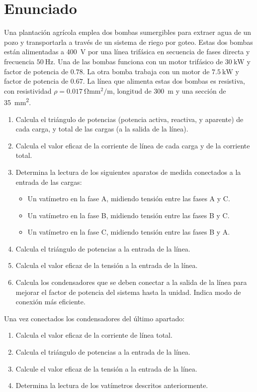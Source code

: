  \section{Enunciado}

 Una plantación agrícola emplea dos bombas sumergibles para extraer
 agua de un pozo y transportarla a través de un sistema de riego por
 goteo. Estas dos bombas están alimentadas a \SI{400}{\volt} por una
 línea trifásica en secuencia de fases directa y frecuencia
 $\SI{50}{\hertz}$. Una de las bombas funciona con un motor trifásico
 de $\SI{30}{\kilo\watt}$ y factor de potencia de $0.78$. La otra bomba
 trabaja con un motor de $\SI{7.5}{\kilo\watt}$ y factor de potencia
 de $0.67$.  La línea que alimenta estas dos bombas es resistiva, con
 resistividad $\rho = \SI{0.017}{\ohm\milli\meter\squared\per\meter}$,
 longitud de \SI{300}{m} y una sección de
 \SI{35}{\milli\meter\squared}.
 
 \begin{enumerate}
 \item Calcula el triángulo de potencias (potencia activa, reactiva, y
   aparente) de cada carga, y total de las cargas (a la salida de la
   línea).
 \item Calcula el valor eficaz de la corriente de línea de
   cada carga y de la corriente total.
 \item Determina la lectura de los siguientes aparatos de medida
   conectados a la entrada de las cargas:
   \begin{itemize}
   \item Un vatímetro en la fase A, midiendo tensión entre las fases A
     y C.
   \item Un vatímetro en la fase B, midiendo tensión entre las fases B
     y C.
   \item Un vatímetro en la fase C, midiendo tensión entre las fases B
     y A.
   \end{itemize}
 \item Calcula el triángulo de potencias a la entrada de la línea.
 \item Calcula el valor eficaz de la tensión a la entrada de la línea.
 \item Calcula los condensadores que se deben conectar a la salida de
   la línea para mejorar el factor de potencia del sistema hasta la
   unidad. Indica modo de conexión más eficiente.
 \end{enumerate}

Una vez conectados los condensadores del último apartado:
\begin{enumerate}[resume]
\item Calcula el valor eficaz de la corriente de línea total.
\item Calcula el triángulo de potencias a la entrada de la línea.
\item Calcule el valor eficaz de la tensión a la entrada de la línea.
\item Determina la lectura de los vatímetros descritos anteriormente.
\end{enumerate}

